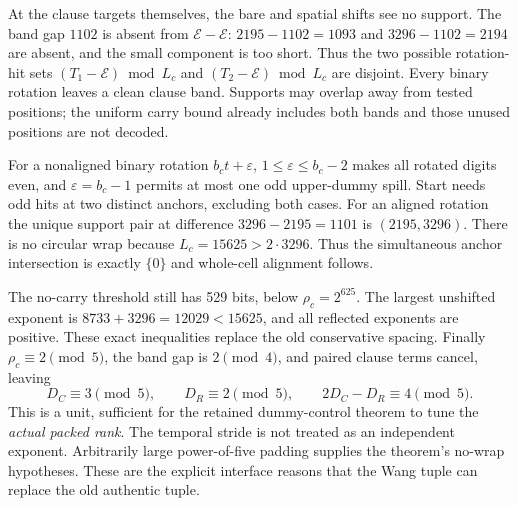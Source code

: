 \documentclass[11pt]{article}
\begin{document}
At the clause targets themselves, the bare and spatial shifts see no support. The band gap $1102$ is absent from $\mathcal E-\mathcal E$: $2195-1102=1093$ and $3296-1102=2194$ are absent, and the small component is too short. Thus the two possible rotation-hit sets $(T_1-\mathcal E)\bmod L_c$ and $(T_2-\mathcal E)\bmod L_c$ are disjoint. Every binary rotation leaves a clean clause band. Supports may overlap away from tested positions; the uniform carry bound already includes both bands and those unused positions are not decoded.

For a nonaligned binary rotation $b_ct+\varepsilon$, $1\le\varepsilon\le b_c-2$ makes all rotated digits even, and $\varepsilon=b_c-1$ permits at most one odd upper-dummy spill. Start needs odd hits at two distinct anchors, excluding both cases. For an aligned rotation the unique support pair at difference $3296-2195=1101$ is $(2195,3296)$. There is no circular wrap because $L_c=15625>2\cdot3296$. Thus the simultaneous anchor intersection is exactly $\{0\}$ and whole-cell alignment follows.

The no-carry threshold still has 529 bits, below $\rho_c=2^{625}$. The largest unshifted exponent is $8733+3296=12029<15625$, and all reflected exponents are positive. These exact inequalities replace the old conservative spacing. Finally $\rho_c\equiv2\pmod5$, the band gap is $2\pmod4$, and paired clause terms cancel, leaving
\[
 D_C\equiv3\pmod5,\qquad D_R\equiv2\pmod5,\qquad
 2D_C-D_R\equiv4\pmod5.
\]
This is a unit, sufficient for the retained dummy-control theorem to tune the \emph{actual packed rank}. The temporal stride is not treated as an independent exponent. Arbitrarily large power-of-five padding supplies the theorem's no-wrap hypotheses. These are the explicit interface reasons that the Wang tuple can replace the old authentic tuple.
\end{document}
